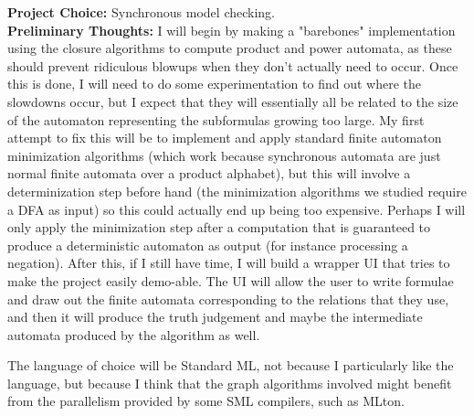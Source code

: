 \documentclass{hw}
\begin{document}

\noindent\textbf{Project Choice:} Synchronous model checking.\\

\noindent\textbf{Preliminary Thoughts:} I will begin by making a "barebones"
implementation using the closure algorithms to compute product and power
automata, as these should prevent ridiculous blowups when they don't actually
need to occur. Once this is done, I will need to do some experimentation to
find out where the slowdowns occur, but I expect that they will essentially all
be related to the size of the automaton representing the subformulas growing
too large. My first attempt to fix this will be to implement and apply standard
finite automaton minimization algorithms (which work because synchronous automata
are just normal finite automata over a product alphabet), but this will involve a determinization
step before hand (the minimization algorithms we studied require a DFA as input)
so this could actually end up being too expensive. Perhaps I will only apply
the minimization step after a computation that is guaranteed to produce a deterministic
automaton as output (for instance processing a negation). After this, if I still
have time, I will build a wrapper UI that tries to make the project easily
demo-able. The UI will allow the user to write formulae and draw out the
finite automata corresponding to the relations that they use, and then it will
produce the truth judgement and maybe the intermediate automata produced
by the algorithm as well.

The language of choice will be Standard ML, not because I particularly like
the language, but because I think that the graph algorithms involved might benefit from
the parallelism provided by some SML compilers, such as MLton.
\end{document}
